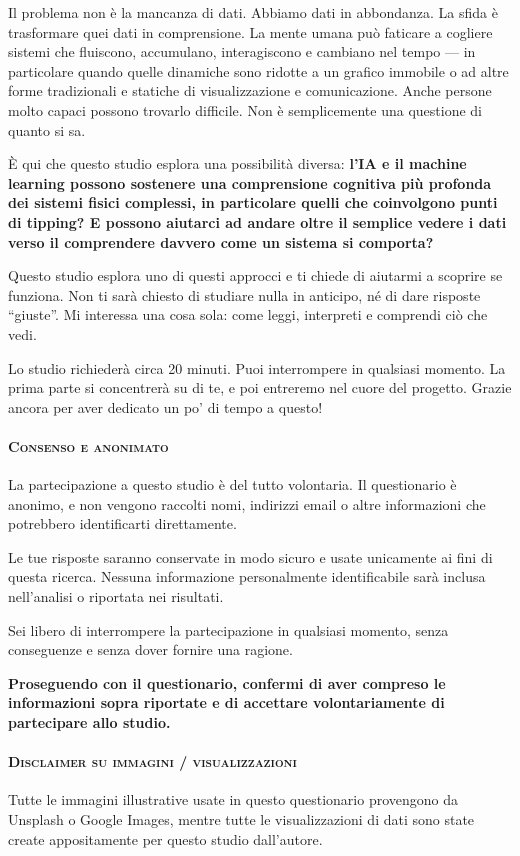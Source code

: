 Il problema non è la mancanza di dati. Abbiamo dati in abbondanza. La sfida è trasformare quei dati
in comprensione. La mente umana può faticare a cogliere sistemi che fluiscono, accumulano,
interagiscono e cambiano nel tempo --- in particolare quando quelle dinamiche sono ridotte a un
grafico immobile o ad altre forme tradizionali e statiche di visualizzazione e comunicazione. Anche
persone molto capaci possono trovarlo difficile. Non è semplicemente una questione di quanto si sa.

È qui che questo studio esplora una possibilità diversa: \textbf{l'IA e il machine learning possono
sostenere una comprensione cognitiva più profonda dei sistemi fisici complessi, in particolare
quelli che coinvolgono punti di tipping? E possono aiutarci ad andare oltre il semplice vedere i
dati verso il comprendere davvero come un sistema si comporta?}

Questo studio esplora uno di questi approcci e ti chiede di aiutarmi a scoprire se funziona. Non ti
sarà chiesto di studiare nulla in anticipo, né di dare risposte ``giuste''. Mi interessa una cosa
sola: come leggi, interpreti e comprendi ciò che vedi.

Lo studio richiederà circa 20 minuti. Puoi interrompere in qualsiasi momento. La prima parte si
concentrerà su di te, e poi entreremo nel cuore del progetto. Grazie ancora per aver dedicato un
po' di tempo a questo!

\paragraph{\textsc{Consenso e anonimato}}
La partecipazione a questo studio è del tutto volontaria. Il questionario è anonimo, e non vengono
raccolti nomi, indirizzi email o altre informazioni che potrebbero identificarti direttamente.

Le tue risposte saranno conservate in modo sicuro e usate unicamente ai fini di questa ricerca.
Nessuna informazione personalmente identificabile sarà inclusa nell'analisi o riportata nei
risultati.

Sei libero di interrompere la partecipazione in qualsiasi momento, senza conseguenze e senza dover
fornire una ragione.

\textbf{Proseguendo con il questionario, confermi di aver compreso le informazioni sopra riportate e
di accettare volontariamente di partecipare allo studio.}

\paragraph{\textsc{Disclaimer su immagini / visualizzazioni}}
Tutte le immagini illustrative usate in questo questionario provengono da Unsplash o Google Images,
mentre tutte le visualizzazioni di dati sono state create appositamente per questo studio
dall'autore.

